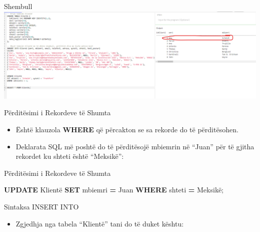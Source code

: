 \documentclass[
  ignorenonframetext,
]{beamer}
\newenvironment{Shaded}{\begin{snugshade}}{\end{snugshade}}
\newcommand{\KeywordTok}[1]{\textcolor[rgb]{0.13,0.29,0.53}{\textbf{#1}}}
\newcommand{\NormalTok}[1]{#1}
\newcommand{\OperatorTok}[1]{\textcolor[rgb]{0.81,0.36,0.00}{\textbf{#1}}}
\newcommand{\StringTok}[1]{\textcolor[rgb]{0.31,0.60,0.02}{#1}}
\providecommand{\tightlist}{%
  \setlength{\itemsep}{0pt}\setlength{\parskip}{0pt}}
\begin{document}
\begin{frame}{Shembull}
\label{shembull-10}
\includegraphics{./Figs/query35.png}
\end{frame}

\begin{frame}{Përditësimi i Rekordeve të Shumta}
\label{puxebrdituxebsimi-i-rekordeve-tuxeb-shumta}
\begin{itemize}
\item
  Është klauzola \textbf{WHERE} që përcakton se sa rekorde do të
  përditësohen.
\item
  Deklarata SQL më poshtë do të përditësojë mbiemrin në ``Juan'' për të
  gjitha rekordet ku shteti është ``Meksikë'':
\end{itemize}
\end{frame}

\begin{frame}[fragile]{Përditësimi i Rekordeve të Shumta}
\label{puxebrdituxebsimi-i-rekordeve-tuxeb-shumta-1}

\begin{Shaded}
\begin{Highlighting}[]
\KeywordTok{UPDATE}\NormalTok{ Klientë}
\KeywordTok{SET}\NormalTok{ mbiemri }\OperatorTok{=} \StringTok{\textquotesingle{}Juan\textquotesingle{}}
\KeywordTok{WHERE}\NormalTok{ shteti }\OperatorTok{=} \StringTok{\textquotesingle{}Meksikë\textquotesingle{}}\NormalTok{;}
\end{Highlighting}
\end{Shaded}
\end{frame}

\begin{frame}{Sintaksa INSERT INTO}
\label{sintaksa-insert-into-7}
\begin{itemize}
\tightlist
\item
  Zgjedhja nga tabela ``Klientë'' tani do të duket kështu:
\end{itemize}
\end{frame}
\end{document}
